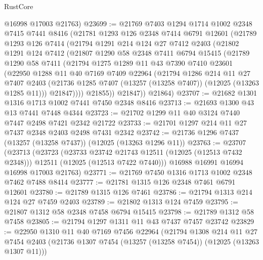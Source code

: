 \begin{lexlean}{RustCore}
\begin{coremodule}
      @16998
      @17003
      @21763)
@23699 := @21769
    @7403
    @1294
    @1714
    @1002
    @2348
    @7415
    @7441
    @8416
    (@21781
      @1293
      @126
      @2348
      @7414
      @6791
      @12601
      (@21789
        @1293
        @126
        @7414
        (@21794
          @1291
          @214
          @124
          @27
          @7412
          @2403
          (@21802
            @1291
            @124
            @7412
            (@21807
              @1290
              @58
              @2348
              @7411
              @6794
              @15415
              (@21789
                @1290
                @58
                @7411
                (@21794
                  @1275
                  @1289
                  @11
                  @43
                  @7390
                  @7410
                  @23601
                  (@22950
                    @1288
                    @11
                    @40
                    @7169
                    @7409
                    @22964
                    (@21794
                      @1286
                      @214
                      @11
                      @27
                      @7407
                      @2403
                      (@21736 @1285 @7407 (@13257 (@13258 @7407)) (@12025 (@13263 @1285 @11)))
                      @21847))))
              @21855))
          @21847))
      @21864)
@23707 := @21682 @1301 @1316 @1713 @1002 @7441 @7450 @2348 @8416
@23713 := @21693 @1300 @43 @13 @7441 @7448 @4344
@23723 := @21702 @1299 @11 @40 @3124 @7440 @7447 @2498 @7421 @2342 @21722
@23733 := @21701 @1297 @214 @11 @27 @7437 @2348 @2403 @2498 @7431 @2342
@23742 := @21736 @1296 @7437 (@13257 (@13258 @7437)) (@12025 (@13263 @1296 @11))
@23763 := @23707
    (@23713
      (@23723
        (@23733 @23742 @21743 @12511 (@12025 (@12513 @7432 @2348)))
        @12511
        (@12025 (@12513 @7422 @7440)))
      @16988
      @16991
      @16994
      @16998
      @17003
      @21763)
@23771 := @21769 @7450 @1316 @1713 @1002 @2348 @7462 @7488 @8414
@23777 := @21781 @1315 @126 @2348 @7461 @6791 @12601
@23780 := @21789 @1315 @126 @7461
@23786 := @21794 @1313 @214 @124 @27 @7459 @2403
@23789 := @21802 @1313 @124 @7459
@23795 := @21807 @1312 @58 @2348 @7458 @6794 @15415
@23798 := @21789 @1312 @58 @7458
@23805 := @21794 @1297 @1311 @11 @43 @7437 @7457 @23742
@23829 := @22950
    @1310
    @11
    @40
    @7169
    @7456
    @22964
    (@21794
      @1308
      @214
      @11
      @27
      @7454
      @2403
      (@21736 @1307 @7454 (@13257 (@13258 @7454)) (@12025 (@13263 @1307 @11)))

\end{coremodule}
\end{lexlean}
